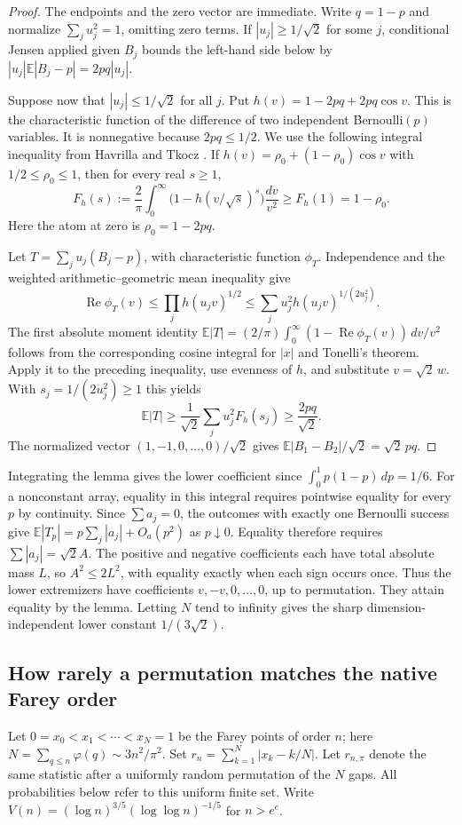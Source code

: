\documentclass[11pt,a4paper]{article}
\begin{document}
\begin{proof}
The endpoints and the zero vector are immediate. Write $q=1-p$ and
normalize $\sum_j u_j^2=1$, omitting zero terms.
If $|u_j|\ge 1/\sqrt2$ for some $j$, conditional Jensen applied
given $B_j$ bounds the left-hand side below by
$|u_j|\mathbb E|B_j-p|=2pq|u_j|$.

Suppose now that $|u_j|\le1/\sqrt2$ for all $j$. Put
$h(v)=1-2pq+2pq\cos v$. This is the characteristic function of the
difference of two independent Bernoulli$(p)$ variables. It is
nonnegative because $2pq\le1/2$. We use the following integral
inequality from Havrilla and Tkocz \cite[proof of Theorem~8,
Section~3.4, equation (23) in the preprint]{ht}. If
$h(v)=\rho_0+(1-\rho_0)\cos v$ with $1/2\le\rho_0\le1$, then
for every real $s\ge1$,
\[
 F_h(s):=\frac2\pi\int_0^\infty
   \bigl(1-h(v/\sqrt s)^s\bigr)\frac{dv}{v^2}
 \ge F_h(1)=1-\rho_0.
\]
Here the atom at zero is $\rho_0=1-2pq$.

Let $T=\sum_j u_j(B_j-p)$, with characteristic function $\phi_T$.
Independence and the weighted arithmetic--geometric mean inequality give
\[
 \operatorname{Re}\phi_T(v)
 \le \prod_j h(u_jv)^{1/2}
 \le \sum_j u_j^2 h(u_jv)^{1/(2u_j^2)} .
\]
The first absolute moment identity
$\mathbb E|T|=(2/\pi)\int_0^\infty(1-\operatorname{Re}\phi_T(v))\,dv/v^2$
follows from the corresponding cosine integral for $|x|$ and Tonelli's
theorem. Apply it to the preceding inequality, use evenness of $h$,
and substitute $v=\sqrt2\,w$. With $s_j=1/(2u_j^2)\ge1$ this yields
\[
 \mathbb E|T|\ge
 \frac1{\sqrt2}\sum_j u_j^2 F_h(s_j)
 \ge \frac{2pq}{\sqrt2}.
\]
The normalized vector $(1,-1,0,\ldots,0)/\sqrt2$ gives
$\mathbb E|B_1-B_2|/\sqrt2=\sqrt2\,pq$.
\end{proof}


Integrating the lemma gives the lower coefficient since
$\int_0^1p(1-p)\,dp=1/6$. For a nonconstant array, equality in this
integral requires pointwise equality for every $p$ by continuity.
Since $\sum a_j=0$, the outcomes with exactly one Bernoulli success give
$\mathbb E|T_p|=p\sum_j|a_j|+O_a(p^2)$ as $p\downarrow0$.
Equality therefore requires $\sum |a_j|=\sqrt2 A$.
The positive and negative coefficients each have total absolute mass
$L$, so $A^2\le 2L^2$, with equality exactly when each sign occurs once.
Thus the lower extremizers have coefficients $v,-v,0,\ldots,0$, up to
permutation. They attain equality by the lemma. Letting $N$ tend to infinity
gives the sharp dimension-independent lower constant $1/(3\sqrt2)$.

\subsection{How rarely a permutation matches the native Farey order}
Let $0=x_0<x_1<\cdots<x_N=1$ be the Farey points of order $n$; here
$N=\sum_{q\le n}\varphi(q)\sim 3n^2/\pi^2$. Set
$r_n=\sum_{k=1}^N|x_k-k/N|$. Let $r_{n,\pi}$ denote the same statistic
after a uniformly random permutation of the $N$ gaps. All probabilities
below refer to this uniform finite set. Write
$V(n)=(\log n)^{3/5}(\log\log n)^{-1/5}$ for $n>e^e$.
\end{document}
